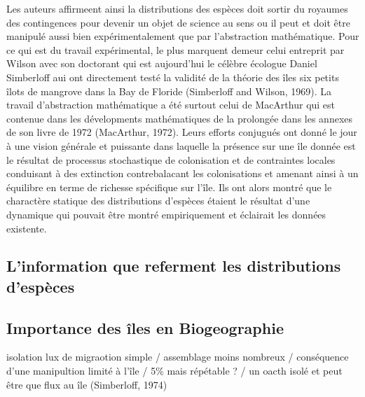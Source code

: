 Les auteurs affirmeent ainsi la distributions des espèces doit sortir du
royaumes des contingences pour devenir un objet de science au sens ou il
peut et doit être manipulé aussi bien expérimentalement que par
l'abstraction mathématique. Pour ce qui est du travail expérimental, le
plus marquent demeur celui entreprit par Wilson avec son doctorant qui
est aujourd'hui le célèbre écologue Daniel Simberloff aui ont
directement testé la validité de la théorie des îles six petits îlots de
mangrove dans la Bay de Floride (Simberloff and Wilson, 1969). La
travail d'abstraction mathématique a été surtout celui de MacArthur qui
est contenue dans les dévelopments mathématiques de la prolongée dans
les annexes de son livre de 1972 (MacArthur, 1972). Leurs efforts
conjugués ont donné le jour à une vision générale et puissante dans
laquelle la présence sur une île donnée est le résultat de processus
stochastique de colonisation et de contraintes locales conduisant à des
extinction contrebalacant les colonisations et amenant ainsi à un
équilibre en terme de richesse spécifique sur l'île. Ils ont alors
montré que le charactère statique des distributions d'espèces étaient le
résultat d'une dynamique qui pouvait être montré empiriquement et
éclairait les données existente.

\subsection{L'information que referment les distributions
d'espèces}\label{linformation-que-referment-les-distributions-despuxe8ces}

\subsection*{Importance des îles en
Biogeographie}\label{importance-des-uxeeles-en-biogeographie}

isolation lux de migraotion simple / assemblage moins nombreux /
conséquence d'une manipultion limité à l'île / 5\% mais répétable ? / un
oacth isolé et peut être que flux au île (Simberloff, 1974)

